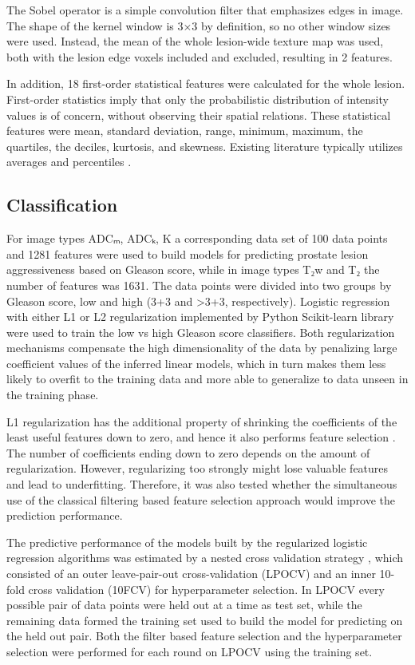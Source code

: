 The Sobel operator \citep{Sobel1990} is a simple convolution filter that
emphasizes edges in image. The shape of the kernel window is 3×3 by definition,
so no other window sizes were used. Instead, the mean of the whole lesion-wide
texture map was used, both with the lesion edge voxels included and excluded,
resulting in 2 features.

In addition, 18 first-order statistical features were calculated for the whole
lesion. First-order statistics imply that only the probabilistic distribution of
intensity values is of concern, without observing their spatial relations. These
statistical features were mean, standard deviation, range, minimum, maximum, the
quartiles, the deciles, kurtosis, and skewness. Existing literature typically
utilizes averages and percentiles \citep{Shaish2016}.


\subsection{Classification}

For image types ADCₘ, ADCₖ, K a corresponding data set of 100 data points and
1281 features were used to build models for predicting prostate lesion
aggressiveness based on Gleason score, while in image types T₂w and T₂ the
number of features was 1631. The data points were divided into two groups by
Gleason score, low and high (3+3 and >3+3, respectively). Logistic regression
with either L1 or L2 regularization \citep{Friedman2010} implemented by Python
Scikit-learn library \citep{Pedregosa2011} were used to train the low vs high
Gleason score classifiers. Both regularization mechanisms compensate the high
dimensionality of the data by penalizing large coefficient values of the
inferred linear models, which in turn makes them less likely to overfit to the
training data and more able to generalize to data unseen in the training phase.

L1 regularization has the additional property of shrinking the coefficients of
the least useful features down to zero, and hence it also performs feature
selection \citep{Park2007}. The number of coefficients ending down to zero
depends on the amount of regularization. However, regularizing too strongly
might lose valuable features and lead to underfitting. Therefore, it was also
tested whether the simultaneous use of the classical filtering based feature
selection approach would improve the prediction performance.

The predictive performance of the models built by the regularized logistic
regression algorithms was estimated by a nested cross validation strategy
\citep{Varma2006}, which consisted of an outer leave-pair-out cross-validation
(LPOCV) \citep{Airola2011} and an inner 10-fold cross validation (10FCV) for
hyperparameter selection. In LPOCV every possible pair of data points were held
out at a time as test set, while the remaining data formed the training set used
to build the model for predicting on the held out pair. Both the filter based
feature selection and the hyperparameter selection were performed for each
round on LPOCV using the training set.

